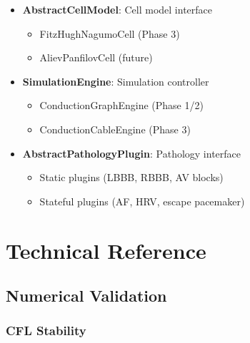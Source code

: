 \documentclass[12pt]{book}
\begin{document}
\begin{itemize}
  \item \textbf{AbstractCellModel}: Cell model interface
    \begin{itemize}
      \item FitzHughNagumoCell (Phase 3)
      \item AlievPanfilovCell (future)
    \end{itemize}

  \item \textbf{SimulationEngine}: Simulation controller
    \begin{itemize}
      \item ConductionGraphEngine (Phase 1/2)
      \item ConductionCableEngine (Phase 3)
    \end{itemize}

  \item \textbf{AbstractPathologyPlugin}: Pathology interface
    \begin{itemize}
      \item Static plugins (LBBB, RBBB, AV blocks)
      \item Stateful plugins (AF, HRV, escape pacemaker)
    \end{itemize}
\end{itemize}


\chapter{Technical Reference}

\section{Numerical Validation}

\subsection{CFL Stability}
\end{document}
